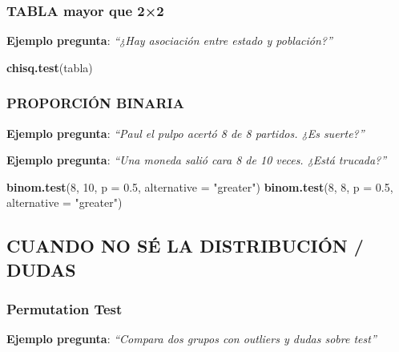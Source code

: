 \documentclass[
  10pt,
]{article}
\newenvironment{Shaded}{\begin{snugshade}}{\end{snugshade}}
\newcommand{\AttributeTok}[1]{\textcolor[rgb]{0.13,0.29,0.53}{#1}}
\newcommand{\DecValTok}[1]{\textcolor[rgb]{0.00,0.00,0.81}{#1}}
\newcommand{\FloatTok}[1]{\textcolor[rgb]{0.00,0.00,0.81}{#1}}
\newcommand{\FunctionTok}[1]{\textcolor[rgb]{0.13,0.29,0.53}{\textbf{#1}}}
\newcommand{\NormalTok}[1]{#1}
\newcommand{\StringTok}[1]{\textcolor[rgb]{0.31,0.60,0.02}{#1}}
\begin{document}
\subsubsection{TABLA mayor que 2×2}\label{tabla-mayor-que-22}

\textbf{Ejemplo pregunta}: \emph{``¿Hay asociación entre estado y
población?''}

\begin{Shaded}
\begin{Highlighting}[]
\FunctionTok{chisq.test}\NormalTok{(tabla)}
\end{Highlighting}
\end{Shaded}

\subsubsection{PROPORCIÓN BINARIA}\label{proporciuxf3n-binaria}

\textbf{Ejemplo pregunta}: \emph{``Paul el pulpo acertó 8 de 8 partidos.
¿Es suerte?''}

\textbf{Ejemplo pregunta}: \emph{``Una moneda salió cara 8 de 10 veces.
¿Está trucada?''}

\begin{Shaded}
\begin{Highlighting}[]
\FunctionTok{binom.test}\NormalTok{(}\DecValTok{8}\NormalTok{, }\DecValTok{10}\NormalTok{, }\AttributeTok{p =} \FloatTok{0.5}\NormalTok{, }\AttributeTok{alternative =} \StringTok{"greater"}\NormalTok{)}
\FunctionTok{binom.test}\NormalTok{(}\DecValTok{8}\NormalTok{, }\DecValTok{8}\NormalTok{, }\AttributeTok{p =} \FloatTok{0.5}\NormalTok{, }\AttributeTok{alternative =} \StringTok{"greater"}\NormalTok{)}
\end{Highlighting}
\end{Shaded}

\subsection{CUANDO NO SÉ LA DISTRIBUCIÓN /
DUDAS}\label{cuando-no-suxe9-la-distribuciuxf3n-dudas}

\subsubsection{Permutation Test}\label{permutation-test}

\textbf{Ejemplo pregunta}: \emph{``Compara dos grupos con outliers y
dudas sobre test''}
\end{document}
